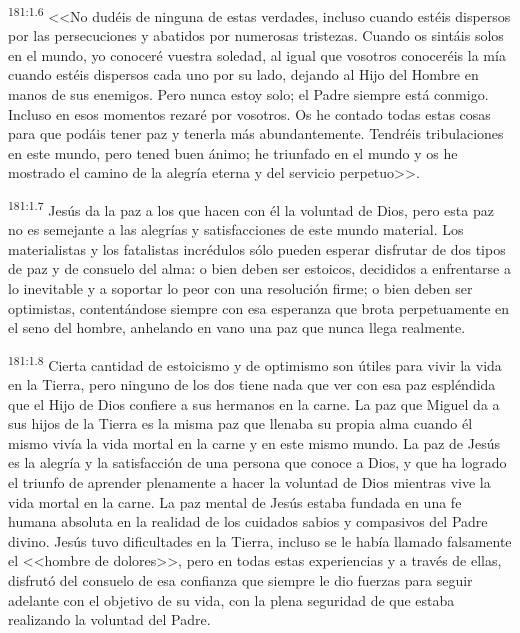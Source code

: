 \par 
\textsuperscript{181:1.6} <<No dudéis de ninguna de estas verdades, incluso cuando estéis dispersos por las persecuciones y abatidos por numerosas tristezas. Cuando os sintáis solos en el mundo, yo conoceré vuestra soledad, al igual que vosotros conoceréis la mía cuando estéis dispersos cada uno por su lado, dejando al Hijo del Hombre en manos de sus enemigos. Pero nunca estoy solo; el Padre siempre está conmigo. Incluso en esos momentos rezaré por vosotros. Os he contado todas estas cosas para que podáis tener paz y tenerla más abundantemente. Tendréis tribulaciones en este mundo, pero tened buen ánimo; he triunfado en el mundo y os he mostrado el camino de la alegría eterna y del servicio perpetuo>>.

\par 
\textsuperscript{181:1.7} Jesús da la paz a los que hacen con él la voluntad de Dios, pero esta paz no es semejante a las alegrías y satisfacciones de este mundo material. Los materialistas y los fatalistas incrédulos sólo pueden esperar disfrutar de dos tipos de paz y de consuelo del alma: o bien deben ser estoicos, decididos a enfrentarse a lo inevitable y a soportar lo peor con una resolución firme; o bien deben ser optimistas, contentándose siempre con esa esperanza que brota perpetuamente en el seno del hombre, anhelando en vano una paz que nunca llega realmente.

\par 
\textsuperscript{181:1.8} Cierta cantidad de estoicismo y de optimismo son útiles para vivir la vida en la Tierra, pero ninguno de los dos tiene nada que ver con esa paz espléndida que el Hijo de Dios confiere a sus hermanos en la carne. La paz que Miguel da a sus hijos de la Tierra es la misma paz que llenaba su propia alma cuando él mismo vivía la vida mortal en la carne y en este mismo mundo. La paz de Jesús es la alegría y la satisfacción de una persona que conoce a Dios, y que ha logrado el triunfo de aprender plenamente a hacer la voluntad de Dios mientras vive la vida mortal en la carne. La paz mental de Jesús estaba fundada en una fe humana absoluta en la realidad de los cuidados sabios y compasivos del Padre divino. Jesús tuvo dificultades en la Tierra, incluso se le había llamado falsamente el <<hombre de dolores>>, pero en todas estas experiencias y a través de ellas, disfrutó del consuelo de esa confianza que siempre le dio fuerzas para seguir adelante con el objetivo de su vida, con la plena seguridad de que estaba realizando la voluntad del Padre.

